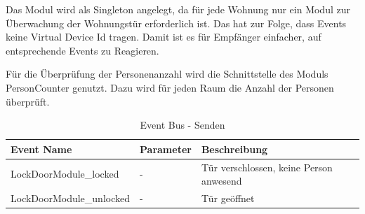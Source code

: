Das Modul wird als Singleton angelegt, da für jede Wohnung nur ein Modul zur Überwachung der Wohnungstür erforderlich ist. Das hat zur Folge, dass Events keine Virtual Device Id tragen. Damit ist es für Empfänger einfacher, auf entsprechende Events zu Reagieren.

Für die Überprüfung der Personenanzahl wird die Schnittstelle des Moduls PersonCounter genutzt. Dazu wird für jeden Raum die Anzahl der Personen überprüft.



\begin{table}
\begin{tabularx}{\textwidth}{
		 >{\hsize=1.25\hsize}X %
		>{\hsize=0.5\hsize\centering}X %
		>{\hsize=1.25\hsize}X %
	}	
	\hline
	\textbf{Event Name}					& \textbf{Parameter}	& \textbf{Beschreibung} \\
	\hline LockDoorModule\_locked		& - 					& Tür verschlossen, keine Person anwesend \\ 
	\hline LockDoorModule\_unlocked		& - 			 		& Tür geöffnet \\ 
	\hline
\end{tabularx}
\caption{Event Bus - Senden}
\end{table}



